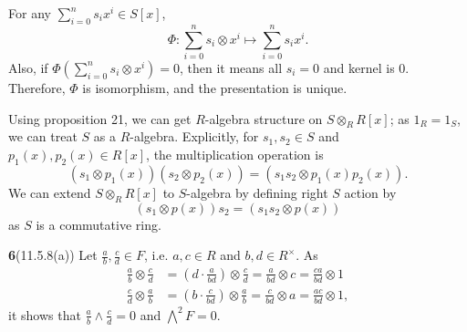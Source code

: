\documentclass[a4paper, 12pt]{article}
\theoremstyle{Mydefinition}
\theoremstyle{Mytheorem}
\begin{document}
For any $\sum_{i=0}^n s_ix^i\in S[x]$,
\begin{equation}
    \Phi:\sum_{i=0}^n s_i\otimes x^i\mapsto \sum_{i=0}^n s_ix^i.
\end{equation}
Also, if $\Phi\left(\sum_{i=0}^n s_i\otimes x^i\right) = 0$, then it means all $s_i=0$ and kernel is $0$. Therefore, $\Phi$ is isomorphism, and the presentation is unique.

Using proposition 21, we can get $R$-algebra structure on $S\otimes_R R[x]$; as $1_R=1_S$, we can treat $S$ as a $R$-algebra. Explicitly, for $s_1,s_2\in S$ and $p_1(x),p_2(x)\in R[x]$, the multiplication operation is
\begin{equation}
       (s_1\otimes p_1(x))(s_2\otimes p_2(x)) = (s_1s_2\otimes p_1(x)p_2(x)).
\end{equation}
We can extend $S\otimes_R R[x]$ to $S$-algebra by defining right $S$ action by
\begin{equation}
    (s_1\otimes p(x))s_2 = (s_1s_2\otimes p(x))
\end{equation}
as $S$ is a commutative ring.

\noindent \textbf{6}(11.5.8(a))
Let $\frac{a}{b},\frac{c}{d}\in F$, i.e. $a,c\in R$ and $b,d\in R^\times$. As
\begin{equation}
    \begin{split}
        \frac{a}{b}\otimes \frac{c}{d} &= \left(d\cdot \frac{a}{bd}\right)\otimes\frac{c}{d} =\frac{a}{bd} \otimes c = \frac{ca}{bd}\otimes 1\\
        \frac{c}{d}\otimes \frac{a}{b} &= \left(b\cdot \frac{c}{bd}\right)\otimes\frac{a}{b} =\frac{c}{bd} \otimes a = \frac{ac}{bd}\otimes 1,
    \end{split}
\end{equation}
it shows that $\frac{a}{b}\wedge \frac{c}{d} = 0$ and $\bigwedge^2 F = 0$.\\
\end{document}
